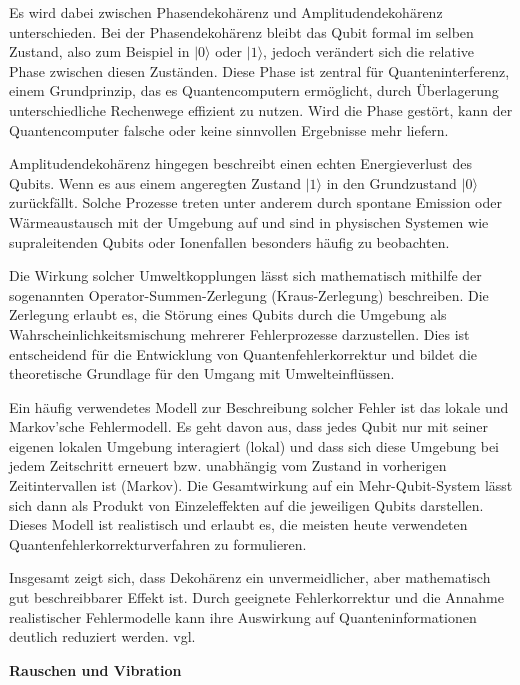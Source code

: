 Es wird dabei zwischen Phasendekohärenz und Amplitudendekohärenz unterschieden. Bei der Phasendekohärenz bleibt das Qubit formal im selben Zustand, also zum Beispiel in $|0\rangle$ oder $|1\rangle$, jedoch verändert sich die relative Phase zwischen diesen Zuständen. Diese Phase ist zentral für Quanteninterferenz, einem Grundprinzip, das es Quantencomputern ermöglicht, durch Überlagerung unterschiedliche Rechenwege effizient zu nutzen. Wird die Phase gestört, kann der Quantencomputer falsche oder keine sinnvollen Ergebnisse mehr liefern. 

Amplitudendekohärenz hingegen beschreibt einen echten Energieverlust des Qubits. Wenn es aus einem angeregten Zustand $|1\rangle$ in den Grundzustand $|0\rangle$ zurückfällt. Solche Prozesse treten unter anderem durch spontane Emission oder Wärmeaustausch mit der Umgebung auf und sind in physischen Systemen wie supraleitenden Qubits oder Ionenfallen besonders häufig zu beobachten.

Die Wirkung solcher Umweltkopplungen lässt sich mathematisch mithilfe der sogenannten Operator-Summen-Zerlegung (Kraus-Zerlegung) beschreiben. Die Zerlegung erlaubt es, die Störung eines Qubits durch die Umgebung als Wahrscheinlichkeitsmischung mehrerer Fehlerprozesse darzustellen. Dies ist entscheidend für die Entwicklung von Quantenfehlerkorrektur und bildet die theoretische Grundlage für den Umgang mit Umwelteinflüssen.

Ein häufig verwendetes Modell zur Beschreibung solcher Fehler ist das lokale und Markov’sche Fehlermodell. Es geht davon aus, dass jedes Qubit nur mit seiner eigenen lokalen Umgebung interagiert (lokal) und dass sich diese Umgebung bei jedem Zeitschritt erneuert bzw. unabhängig vom Zustand in vorherigen Zeitintervallen ist (Markov). Die Gesamtwirkung auf ein Mehr-Qubit-System lässt sich dann als Produkt von Einzeleffekten auf die jeweiligen Qubits darstellen. Dieses Modell ist realistisch und erlaubt es, die meisten heute verwendeten Quantenfehlerkorrekturverfahren zu formulieren. 

Insgesamt zeigt sich, dass Dekohärenz  ein unvermeidlicher, aber mathematisch gut beschreibbarer Effekt ist. Durch geeignete Fehlerkorrektur und die Annahme realistischer Fehlermodelle kann ihre Auswirkung auf Quanteninformationen deutlich reduziert werden. vgl. \cite[Seite 332-339]{rieffelQuantumComputingGentle2011a}\medskip



\textbf{Rauschen und Vibration}

